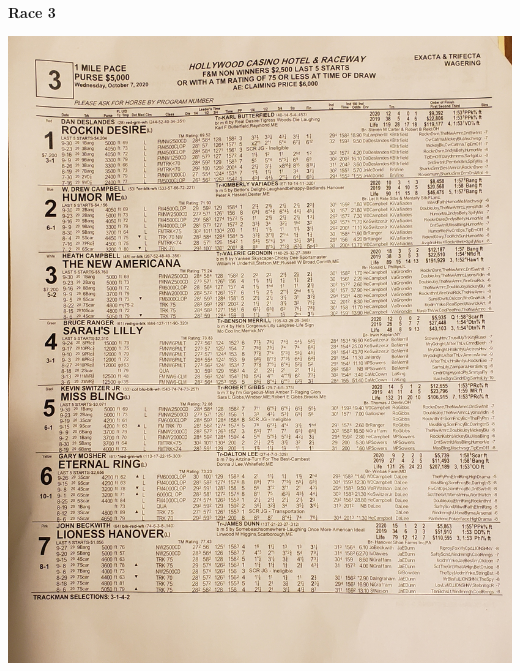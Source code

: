 \documentclass{article}
\begin{document}
\begin{center}
\small{~\\}
\textbf{\LARGE{\textcolor[rgb]{0,0,0}{Race 3 }}}\\
\begin{turn}{0}
\includegraphics[scale=0.10]{race03.jpg}
\end{turn}
\end{center}

\newpage
\end{document}

